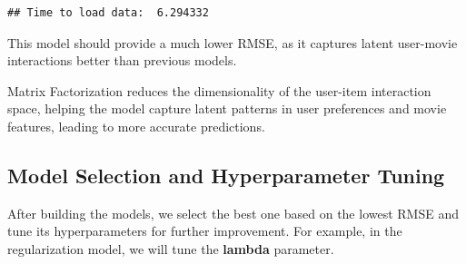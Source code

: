 \documentclass[
]{article}
\begin{document}
\begin{verbatim}
## Time to load data:  6.294332
\end{verbatim}

This model should provide a much lower RMSE, as it captures latent
user-movie interactions better than previous models.

Matrix Factorization reduces the dimensionality of the user-item
interaction space, helping the model capture latent patterns in user
preferences and movie features, leading to more accurate predictions.

\subsection{Model Selection and Hyperparameter
Tuning}\label{model-selection-and-hyperparameter-tuning}

After building the models, we select the best one based on the lowest
RMSE and tune its hyperparameters for further improvement. For example,
in the regularization model, we will tune the \textbf{lambda} parameter.
\end{document}
